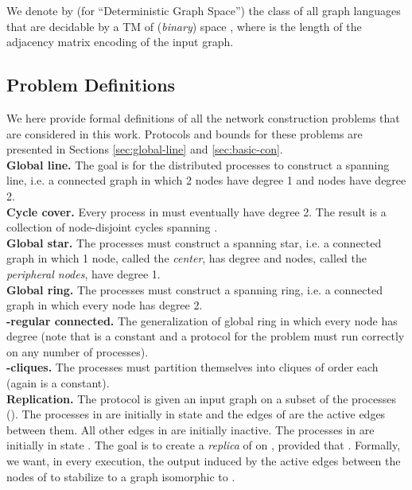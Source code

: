 \documentclass[oribibl, 11pt]{llncs}
\begin{document}
We denote by  (for ``Deterministic Graph Space'') the class of all graph languages that are decidable by a TM of (\emph{binary}) space , where  is the length of the adjacency matrix encoding of the input graph.

\subsection{Problem Definitions}
\label{sec:problems}

We here provide formal definitions of all the network construction problems that are considered in this work. Protocols and bounds for these problems are presented in Sections \ref{sec:global-line} and \ref{sec:basic-con}.\\

\noindent\textbf{Global line.} The goal is for the  distributed processes to construct a spanning line, i.e. a connected graph in which 2 nodes have degree 1 and  nodes have degree 2.\\

\noindent\textbf{Cycle cover.} Every process in  must eventually have degree 2. The result is a collection of node-disjoint cycles spanning .\\

\noindent\textbf{Global star.} The processes must construct a spanning star, i.e. a connected graph in which 1 node, called the \emph{center}, has degree  and  nodes, called the \emph{peripheral nodes}, have degree 1.\\

\noindent\textbf{Global ring.} The processes must construct a spanning ring, i.e. a connected graph in which every node has degree 2.\\

\noindent\textbf{-regular connected.} The generalization of global ring in which every node has degree  (note that  is a constant and a protocol for the problem must run correctly on any number  of processes).\\

\noindent\textbf{-cliques.} The processes must partition themselves into  cliques of order  each (again  is a constant).\\

\noindent\textbf{Replication.} The protocol is given an input graph  on a subset  of the processes (). The processes in  are initially in state  and the edges of  are the active edges between them. All other edges in  are initially inactive. The processes in  are initially in state . The goal is to create a \emph{replica} of  on , provided that . Formally, we want, in every execution, the output induced by the active edges between the nodes of  to stabilize to a graph isomorphic to .
\end{document}
